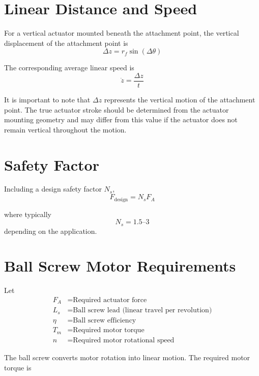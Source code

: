 \documentclass[11pt]{article}
\begin{document}
\section{Linear Distance and Speed}

For a vertical actuator mounted beneath the attachment
point, the vertical displacement of the attachment point is
\[
    \boxed{
        \Delta z = r_f \sin(\Delta\theta)
    }
\]

The corresponding average linear speed is
\[
    \boxed{
        \dot z = \frac{\Delta z}{t}
    }
\]

It is important to note that $\Delta z$ represents the
vertical motion of the attachment point. The true actuator
stroke should be determined from the actuator mounting
geometry and may differ from this value if the actuator
does not remain vertical throughout the motion.

\section{Safety Factor}

Including a design safety factor $N_s$,
\[
    \boxed{
        F_{\mathrm{design}} = N_s F_A
    }
\]

where typically
\[
    N_s = 1.5\text{--}3
\]
depending on the application.

\section{Ball Screw Motor Requirements}

Let
\begin{align*}
    F_A &= \text{Required actuator force} \\
    L_s &= \text{Ball screw lead (linear travel per revolution)} \\
    \eta &= \text{Ball screw efficiency} \\
    T_m &= \text{Required motor torque} \\
    n   &= \text{Required motor rotational speed}
\end{align*}

The ball screw converts motor rotation into linear motion. The
required motor torque is
\end{document}

